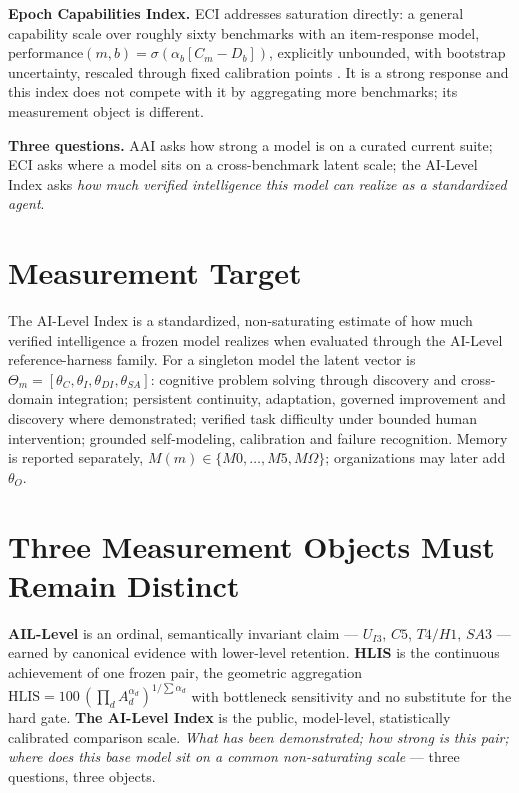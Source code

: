 \textbf{Epoch Capabilities Index.} ECI addresses saturation directly: a general capability scale over roughly sixty benchmarks with an item-response model, $\text{performance}(m, b) = \sigma(\alpha_b[C_m - D_b])$, explicitly unbounded, with bootstrap uncertainty, rescaled through fixed calibration points \citep{epoch2026eci}. It is a strong response and this index does not compete with it by aggregating more benchmarks; its measurement object is different.

\textbf{Three questions.} AAI asks how strong a model is on a curated current suite; ECI asks where a model sits on a cross-benchmark latent scale; the AI-Level Index asks \emph{how much verified intelligence this model can realize as a standardized agent}.

\section{Measurement Target}\label{sec:target}

The AI-Level Index is a standardized, non-saturating estimate of how much verified intelligence a frozen model realizes when evaluated through the AI-Level reference-harness family. For a singleton model the latent vector is $\Theta_m = [\theta_C, \theta_I, \theta_{DI}, \theta_{SA}]$: cognitive problem solving through discovery and cross-domain integration; persistent continuity, adaptation, governed improvement and discovery where demonstrated; verified task difficulty under bounded human intervention; grounded self-modeling, calibration and failure recognition. Memory is reported separately, $M(m) \in \{M0, \ldots, M5, M\Omega\}$; organizations may later add $\theta_O$.

\section{Three Measurement Objects Must Remain Distinct}\label{sec:three}

\textbf{AIL-Level} is an ordinal, semantically invariant claim --- $U_{I3}$, $C5$, $T4/H1$, $SA3$ --- earned by canonical evidence with lower-level retention. \textbf{HLIS} is the continuous achievement of one frozen pair, the geometric aggregation $\text{HLIS} = 100\,(\prod_d A_d^{\alpha_d})^{1/\sum\alpha_d}$ with bottleneck sensitivity and no substitute for the hard gate. \textbf{The AI-Level Index} is the public, model-level, statistically calibrated comparison scale. \emph{What has been demonstrated; how strong is this pair; where does this base model sit on a common non-saturating scale} --- three questions, three objects.

